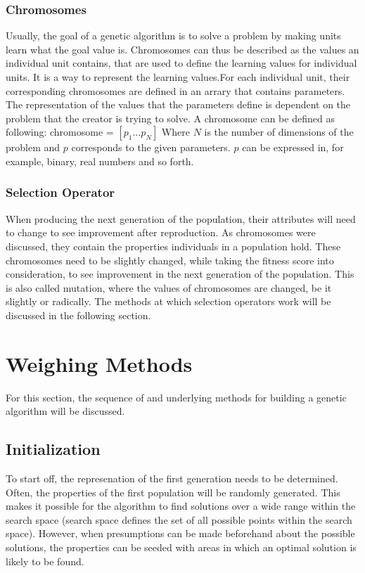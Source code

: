 \documentclass{article}
\begin{document}
\subsubsection{Chromosomes}
Usually, the goal of a genetic algorithm is to solve a problem by making units learn what the goal value is. Chromosomes can thus be described as the values an individual unit contains, that are used to define the learning values for individual units. It is a way to represent the learning values.\smallbreak For each individual unit, their corresponding chromosomes are defined in an arrary that contains parameters. The representation of the values that the parameters define is dependent on the problem that the creator is trying to solve. A chromosome can be defined as following:\bigbreak
chromosome = $\left[ p_{1} ... p_{N} \right]$\bigbreak
Where $N$ is the number of dimensions of the problem and $p$ corresponds to the given parameters. $p$ can be expressed in, for example, binary, real numbers and so forth.

\bigbreak
\subsubsection{Selection Operator}
When producing the next generation of the population, their attributes will need to change to see improvement after reproduction. As chromosomes were discussed, they contain the properties individuals in a population hold. These chromosomes need to be slightly changed, while taking the fitness score into consideration, to see improvement in the next generation of the population. This is also called mutation, where the values of chromosomes are changed, be it slightly or radically. The methods at which selection operators work will be discussed in the following section.

\newpage
\section{Weighing Methods}
For this section, the sequence of and underlying methods for building a genetic algorithm will be discussed. 
\bigskip

\subsection{Initialization}
To start off, the represenation of the first generation needs to be determined. Often, the properties of the first population will be randomly generated. This makes it possible for the algorithm to find solutions over a wide range within the search space (search space defines the set of all possible points within the search space). However, when presumptions can be made beforehand about the possible solutions, the properties can be seeded with areas in which an optimal solution is likely to be found.
\end{document}
